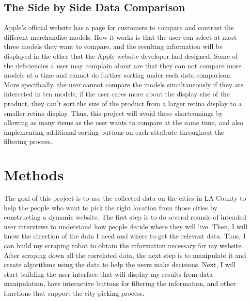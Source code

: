 \documentclass[10pt,twocolumn]{article}
\begin{document}
\subsection{The Side by Side Data Comparison}
Apple's official website has a page for customers to compare and contrast the different merchandise models. How it works is that the user can select at most three models they want to compare, and the resulting information will be displayed in the other that the Apple website developer had designed. Some of the deficiencies a user may complain about are that they can not compare more models at a time and cannot do further sorting under each data comparison. More specifically, the user cannot compare the models simultaneously if they are interested in ten models; if the user cares more about the display size of the product, they can't sort the size of the product from a larger retina display to a smaller retina display. Thus, this project will avoid these shortcomings by allowing as many items as the user wants to compare at the same time, and also implementing additional sorting buttons on each attribute throughout the filtering process.

\section{Methods}
The goal of this project is to use the collected data on the cities in LA County to help the people who want to pick the right location from those cities by constructing a dynamic website. The first step is to do several rounds of intended user interviews to understand how people decide where they will live. Then, I will know the direction of the data I need and where to get the relevant data. Thus, I can build my scraping robot to obtain the information necessary for my website. After scraping down all the correlated data, the next step is to manipulate it and create algorithms using the data to help the users make decisions. Next, I will start building the user interface that will display my results from data manipulation, have interactive buttons for filtering the information, and other functions that support the city-picking process.
\end{document}
